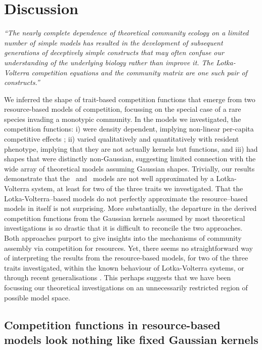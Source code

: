 \documentclass[a4paper,11pt]{article}
\begin{document}
\section{Discussion}

\emph{``The nearly complete dependence of theoretical community ecology on a
limited number of simple models has resulted in the development of subsequent
generations of deceptively simple constructs that may often confuse our
understanding of the underlying biology rather than improve it. The
Lotka-Volterra competition equations and the community matrix are one such
pair of constructs.''} \citep{Neill-1974}

We inferred the shape of trait-based competition functions that emerge
from two resource-based models of competition, focussing on the
special case of a rare species invading a monotypic community.
%
In the models we investigated, the competition functions: i) were
density dependent, implying non-linear per-capita competitive effects
\citep{Abrams-1980}; ii) varied qualitatively and quantitatively with
resident phenotype,
implying that they are not actually kernels but functions,
%
and iii) had shapes that were distinctly non-Gaussian, suggesting
limited connection with the wide array of theoretical models assuming
Gaussian shapes.
%
Trivially, our results demonstrate that the \Rstar\ and \plant\ models
are not well approximated by a Lotka-Volterra system, at least for two
of the three traits we investigated. That the Lotka-Volterra--based
models do not perfectly approximate the resource--based models in
itself is not surprising.
%
More substantially, the departure in the derived competition functions
from the Gaussian kernels assumed by most theoretical investigations
is so drastic that it is difficult to reconcile the two approaches.
Both approaches purport to give insights into the mechanisms of
community assembly via competition for resources.  Yet, there seems no
straightforward way of interpreting the results from the
resource-based models, for two of the three traits investigated,
within the known behaviour of Lotka-Volterra systems, or through
recent generalisations \citep{Leimar-2013}. This perhaps suggests that
we have been focussing our theoretical investigations on an
unnecessarily restricted region of possible model space.

\subsection{Competition functions in resource-based models look nothing like
fixed Gaussian kernels}
\end{document}
